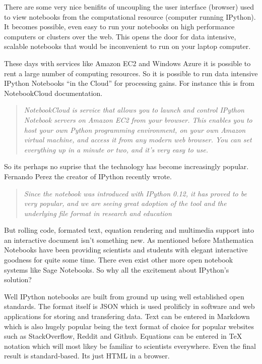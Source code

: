 \documentclass[11pt, a4paper]{article}  %
\begin{document}
\begin{multicols}{2}
There are some very nice benifits of uncoupling the user interface (browser)
used to view notebooks from the computational resource (computer running
IPython). It becomes possible, even easy to run your notebooks on high
performance computers or clusters over the web. This opens the door for data
intensive, scalable notebooks that would be inconvenient to run on your laptop
computer. 

These days with services like Amazon EC2 and Windows Azure it is possible to
rent a large number of computing resources. So it is possible to run data
intensive IPython Notebooks ``in the Cloud'' for processing gains. For instance
this is from NotebookCloud documentation.

\begin{quote}
\textit{NotebookCloud is service that allows you to launch and control IPython
Notebook servers on Amazon EC2 from your browser. This enables you to host
your own Python programming environment, on your own Amazon virtual machine,
and access it from any modern web browser. You can set everything up in a
minute or two, and it's very easy to use.}
\end{quote}

So its perhaps no suprise that the technology has become increasingly popular.
Fernando Perez the creator of IPython recently wrote. \cite{perez}

\begin{quote}
\textit{Since the notebook was introduced with IPython 0.12, it has proved to
be very popular, and we are seeing great adoption of the tool and the
underlying file format in research and education}
\end{quote}

But rolling code, formated text, equation rendering and multimedia support
into an interactive document isn't something new. As mentioned before
Mathematica Notebooks have been providing scientists and students with elegant
interactive goodness for quite some time. There even exist other more open
notebook systems like Sage Notebooks. So why all the excitement about
IPython's solution?

Well IPython notebooks are built from ground up using well established open
standards. The format itself is JSON which is used prolificly in software and
web applications for storing and transfering data. Text can be entered in
Markdown which is also hugely popular being the text format of choice for
popular websites such as StackOverflow, Reddit and Github. Equations can be
entered in TeX notation which will most likey be familiar to scientists
everywhere. Even the final result is standard-based. Its just HTML in a
browser.


\end{multicols}
\end{document}
